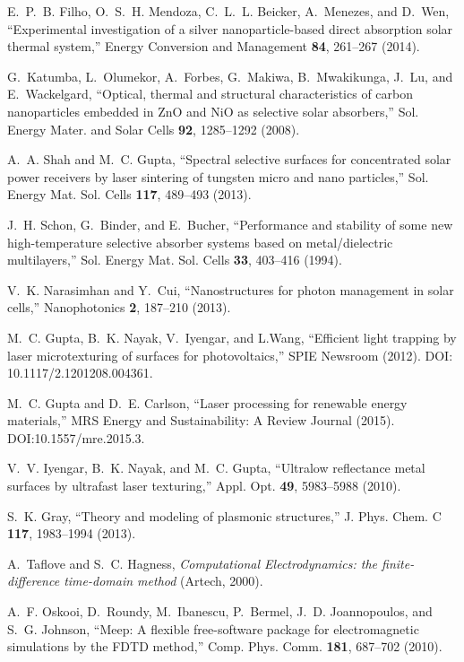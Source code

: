 \documentclass[10pt,letterpaper]{article}
\begin{document}
\begin{thebibliography}{100}
E.~P.~B. Filho, O.~S.~H. Mendoza, C.~L.~L. Beicker, A.~Menezes, and D.~Wen,
  \enquote{Experimental investigation of a silver nanoparticle-based direct
  absorption solar thermal system,} Energy Conversion and Management
  \textbf{84}, 261--267 (2014).

G.~Katumba, L.~Olumekor, A.~Forbes, G.~Makiwa, B.~Mwakikunga, J.~Lu, and
  E.~Wackelgard, \enquote{Optical, thermal and structural characteristics of
  carbon nanoparticles embedded in {Z}n{O} and {N}i{O} as selective solar
  absorbers,} Sol. Energy Mater. and Solar Cells \textbf{92}, 1285--1292
  (2008).

A.~A. Shah and M.~C. Gupta, \enquote{Spectral selective surfaces for
  concentrated solar power receivers by laser sintering of tungsten micro and
  nano particles,} Sol. Energy Mat. Sol. Cells \textbf{117}, 489--493 (2013).

J.~H. Schon, G.~Binder, and E.~Bucher, \enquote{Performance and stability of
  some new high-temperature selective absorber systems based on
  metal/dielectric multilayers,} Sol. Energy Mat. Sol. Cells \textbf{33},
  403--416 (1994).

V.~K. Narasimhan and Y.~Cui, \enquote{Nanostructures for photon management in
  solar cells,} Nanophotonics \textbf{2}, 187–210 (2013).

M.~C. Gupta, B.~K. Nayak, V.~Iyengar, and L.Wang, \enquote{Efficient light
  trapping by laser microtexturing of surfaces for photovoltaics,} SPIE
  Newsroom  (2012). DOI: 10.1117/2.1201208.004361.

M.~C. Gupta and D.~E. Carlson, \enquote{Laser processing for renewable energy
  materials,} MRS Energy and Sustainability: A Review Journal  (2015).
  DOI:10.1557/mre.2015.3.

V.~V. Iyengar, B.~K. Nayak, and M.~C. Gupta, \enquote{Ultralow reflectance
  metal surfaces by ultrafast laser texturing,} Appl. Opt. \textbf{49},
  5983--5988 (2010).

S.~K. Gray, \enquote{Theory and modeling of plasmonic structures,} J. Phys.
  Chem. C \textbf{117}, 1983--1994 (2013).

A.~Taflove and S.~C. Hagness, \emph{Computational Electrodynamics: the
  finite-difference time-domain method} (Artech, 2000).

A.~F. Oskooi, D.~Roundy, M.~Ibanescu, P.~Bermel, J.~D. Joannopoulos, and S.~G.
  Johnson, \enquote{Meep: A flexible free-software package for electromagnetic
  simulations by the {FDTD} method,} Comp. Phys. Comm. \textbf{181}, 687–702
  (2010).


\end{thebibliography}
\end{document}
